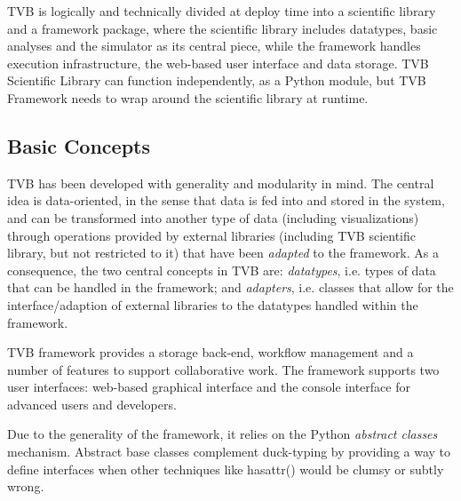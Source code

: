 TVB is logically and technically divided at deploy time into a scientific
library and a framework package, where the scientific library includes
datatypes, basic analyses and the simulator as its central piece, while the
framework handles execution infrastructure, the web-based user interface and
data storage.  TVB Scientific Library can function independently, as a Python
module, but TVB Framework needs to wrap around the scientific library at
runtime. 


\subsection{Basic Concepts}

TVB has been developed with generality and modularity in mind. The central idea
is data-oriented, in the sense that data is fed into and stored in the system,
and can be transformed into another type of data (including visualizations) 
through operations provided by external libraries (including TVB scientific 
library, but not restricted to it) that have been \emph{adapted} to the 
framework. As a consequence, the two central concepts in TVB are: 
\emph{datatypes}, i.e. types of data that can be handled in the framework; and
\emph{adapters}, i.e. classes that allow for the interface/adaption of external
libraries to the datatypes handled within the framework.

TVB framework provides a storage back-end, workflow management and a number of
features to support collaborative work. The framework supports two user 
interfaces: web-based graphical interface and the console interface for 
advanced users and developers.

Due to the generality of the framework, it relies on the Python \emph{abstract classes} mechanism.
Abstract base classes complement duck-typing by providing a way to define
interfaces when other techniques like hasattr() would be clumsy or subtly wrong.
   
